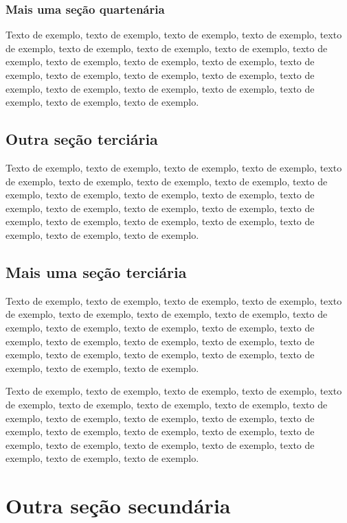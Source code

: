 \documentclass[
	12pt,				%
	oneside,			%
	a4paper,			%
	english,			%
	brazil				%
	]{abntex2ppgsi}
\begin{document}
\subsubsection{Mais uma seção quartenária}

Texto de exemplo, texto de exemplo, texto de exemplo, texto de exemplo, texto de exemplo, texto de exemplo, texto de exemplo, texto de exemplo, texto de exemplo, texto de exemplo, texto de exemplo, texto de exemplo, texto de exemplo, texto de exemplo, texto de exemplo, texto de exemplo, texto de exemplo, texto de exemplo, texto de exemplo, texto de exemplo, texto de exemplo, texto de exemplo, texto de exemplo.

\subsection{Outra seção terciária}

Texto de exemplo, texto de exemplo, texto de exemplo, texto de exemplo, texto de exemplo, texto de exemplo, texto de exemplo, texto de exemplo, texto de exemplo, texto de exemplo, texto de exemplo, texto de exemplo, texto de exemplo, texto de exemplo, texto de exemplo, texto de exemplo, texto de exemplo, texto de exemplo, texto de exemplo, texto de exemplo, texto de exemplo, texto de exemplo, texto de exemplo.

\subsection{Mais uma seção terciária}

Texto de exemplo, texto de exemplo, texto de exemplo, texto de exemplo, texto de exemplo, texto de exemplo, texto de exemplo, texto de exemplo, texto de exemplo, texto de exemplo, texto de exemplo, texto de exemplo, texto de exemplo, texto de exemplo, texto de exemplo, texto de exemplo, texto de exemplo, texto de exemplo, texto de exemplo, texto de exemplo, texto de exemplo, texto de exemplo, texto de exemplo.

Texto de exemplo, texto de exemplo, texto de exemplo, texto de exemplo, texto de exemplo, texto de exemplo, texto de exemplo, texto de exemplo, texto de exemplo, texto de exemplo, texto de exemplo, texto de exemplo, texto de exemplo, texto de exemplo, texto de exemplo, texto de exemplo, texto de exemplo, texto de exemplo, texto de exemplo, texto de exemplo, texto de exemplo, texto de exemplo, texto de exemplo.

\section{Outra seção secundária}
\end{document}
